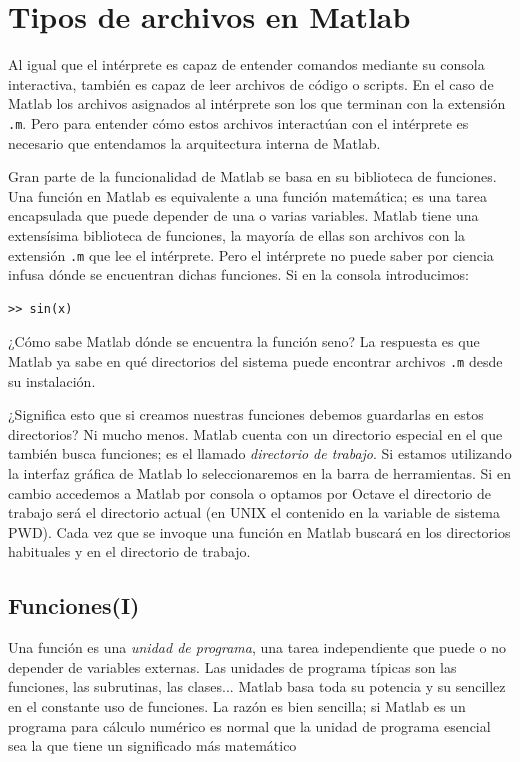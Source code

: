 \section{Tipos de archivos en Matlab}

Al igual que el intérprete es capaz de entender comandos mediante su
consola interactiva, también es capaz de leer archivos de código o
scripts. En el caso de Matlab los archivos asignados al intérprete
son los que terminan con la extensión \texttt{.m}. Pero para entender
cómo estos archivos interactúan con el intérprete es necesario 
que entendamos la arquitectura interna de Matlab.

Gran parte de la funcionalidad de Matlab se basa en su biblioteca de
funciones.  Una función en Matlab es equivalente a una función
matemática; es una tarea encapsulada que puede depender de una o
varias variables.  Matlab tiene una extensísima biblioteca de funciones, 
la mayoría de ellas son archivos con la extensión \texttt{.m} que
lee el intérprete.  Pero el intérprete no puede saber por ciencia infusa
dónde se encuentran dichas funciones.  Si en la consola introducimos:
\begin{lstlisting}
>> sin(x)
\end{lstlisting}
¿Cómo sabe Matlab dónde se encuentra la función seno?  La respuesta es
que Matlab ya sabe en qué directorios del sistema puede encontrar
archivos \texttt{.m} desde su instalación.

¿Significa esto que si creamos nuestras funciones debemos guardarlas
en estos directorios?  Ni mucho menos.  Matlab cuenta con un directorio
especial en el que también busca funciones; es el llamado \emph{directorio
de trabajo}.  Si estamos utilizando la interfaz gráfica de Matlab lo
seleccionaremos en la barra de herramientas.  Si en cambio accedemos 
a Matlab por consola o optamos por Octave el directorio de trabajo
será el directorio actual (en UNIX el contenido en la variable de
sistema PWD).  Cada vez que se invoque una función en Matlab buscará
en los directorios habituales y en el directorio de trabajo.

\subsection{Funciones(I)\label{sub:Funciones(I)}}

Una función es una \emph{unidad de programa}, una tarea
independiente que puede o no depender de variables externas.  Las unidades
de programa típicas son las funciones, las subrutinas, las clases...
Matlab basa toda su potencia y su sencillez en el constante uso de
funciones.  La razón es bien sencilla; si Matlab es un programa para
cálculo numérico es normal que la unidad de programa esencial sea
la que tiene un significado más matemático

